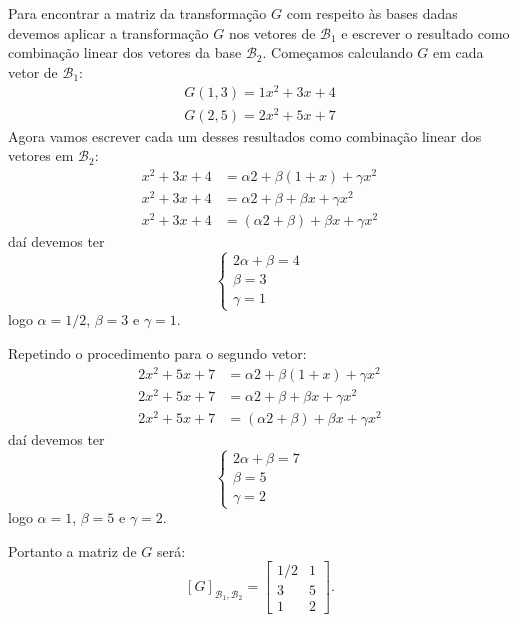 \documentclass[12pt]{exam}
\begin{document}
    \solucao Para encontrar a matriz da transformação $G$ com respeito às bases dadas devemos aplicar a transformação $G$ nos vetores
    de $\mathcal{B}_1$ e escrever o resultado como combinação linear dos vetores da base $\mathcal{B}_2$. Começamos calculando $G$ em
    cada vetor de $\mathcal{B}_1$:
    \begin{align*}
        G(1, 3) = 1x^2 + 3x + 4\\
        G(2, 5) = 2x^2 + 5x + 7
    \end{align*}
    Agora vamos escrever cada um desses resultados como combinação linear dos vetores em $\mathcal{B}_2$:
    \begin{align*}
        x^2 + 3x + 4 &= \alpha 2 + \beta(1 + x) + \gamma x^2\\
        x^2 + 3x + 4 &= \alpha 2 + \beta + \beta x + \gamma x^2\\
        x^2 + 3x + 4 &= (\alpha 2 + \beta) + \beta x + \gamma x^2
    \end{align*}
    daí devemos ter
    \[
        \begin{cases}
            2\alpha + \beta = 4\\
            \beta = 3\\
            \gamma = 1
        \end{cases}
    \]
    logo $\alpha = 1/2$, $\beta = 3$ e $\gamma = 1$.

    Repetindo o procedimento para o segundo vetor:
    \begin{align*}
        2x^2 + 5x + 7 &= \alpha 2 + \beta(1 + x) + \gamma x^2\\
        2x^2 + 5x + 7 &= \alpha 2 + \beta + \beta x + \gamma x^2\\
        2x^2 + 5x + 7 &= (\alpha 2 + \beta) + \beta x + \gamma x^2
    \end{align*}
    daí devemos ter
    \[
        \begin{cases}
            2\alpha + \beta = 7\\
            \beta = 5\\
            \gamma = 2
        \end{cases}
    \]
    logo $\alpha = 1$, $\beta = 5$ e $\gamma = 2$.

    Portanto a matriz de $G$ será:
    \[
        [G]_{\mathcal{B}_1, \mathcal{B}_2} = \begin{bmatrix}1/2 & 1\\ 3 & 5\\ 1 & 2\end{bmatrix}.
    \]
\end{document}
